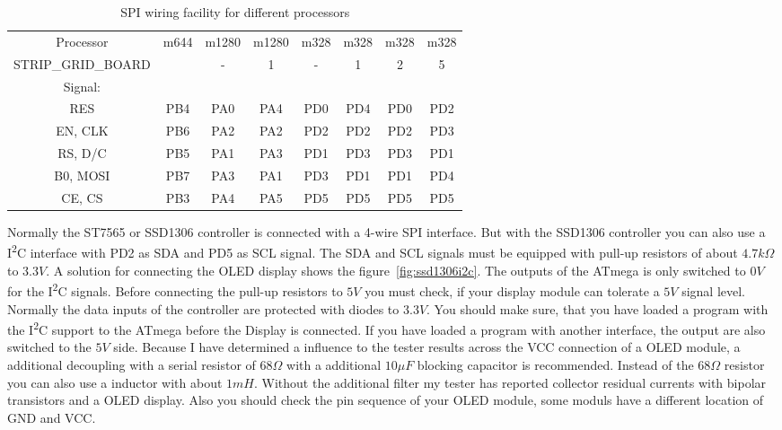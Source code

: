 \begin{table}[H]
  \begin{center}
    \begin{tabular}{| c || c | c | c | c | c | c | c |}
    \hline
 Processor  & m644  & m1280 & m1280  & m328 & m328 & m328 & m328 \\
STRIP\_GRID\_BOARD &       &   -   &   1    &  -   &  1   &  2   &  5   \\
    \hline
    \hline
Signal:     &       &       &        &      &      &      &      \\
  RES       &  PB4  & PA0   &  PA4   & PD0  & PD4  & PD0  & PD2 \\
    \hline
  EN, CLK   &  PB6  & PA2   &  PA2   & PD2  & PD2  & PD2  & PD3 \\
    \hline
  RS, D/C   &  PB5  & PA1   &  PA3   & PD1  & PD3  & PD3  & PD1 \\
    \hline
  B0, MOSI  &  PB7  & PA3   &  PA1   & PD3  & PD1  & PD1  & PD4 \\
    \hline
  CE, CS    &  PB3  & PA4   &  PA5   & PD5  & PD5  & PD5  & PD5 \\
    \hline
    \end{tabular}
  \end{center}
  \caption{SPI wiring facility for different processors}
  \label{tab:spi-processor}
\end{table}

Normally the ST7565 or SSD1306 controller is connected with a 4-wire SPI interface.
But with the SSD1306 controller you can also use a I\textsuperscript{2}C interface with PD2 as SDA and PD5 as SCL signal.
The SDA and SCL signals must be equipped with pull-up resistors of about \(4.7k\Omega\) to \(3.3V\).
A solution for connecting the OLED display shows the figure~\ref{fig:ssd1306i2c}.
The outputs of the ATmega is only switched to \(0V\) for the I\textsuperscript{2}C signals.
Before connecting the pull-up resistors to \(5V\) you must check, if your display module can tolerate
a \(5V\) signal level. Normally the data inputs of the controller are protected with diodes to \(3.3V\).
You should make sure, that you have loaded a program with the I\textsuperscript{2}C support to the ATmega 
before the Display is connected. If you have loaded a program with another interface, 
the output are also switched to the \(5V\) side.
Because I have determined a influence to the tester results across the VCC connection of a OLED module,
a additional decoupling with a serial resistor of \(68\Omega\) with a additional \(10\mu F\) blocking capacitor
is recommended. Instead of the \(68\Omega\) resistor you can also use a inductor with about \(1mH\).
Without the additional filter my tester has reported collector residual currents with bipolar transistors and a
OLED display.
Also you should check the pin sequence of your OLED module, some moduls have a different location of GND and VCC.
 
